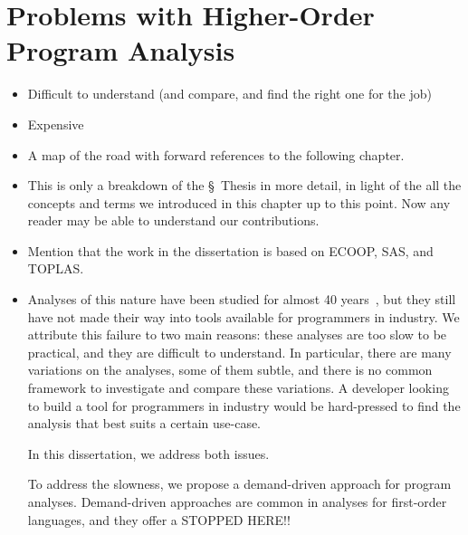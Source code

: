 \documentclass[12pt, oneside]{book}
\begin{document}
\section{Problems with Higher-Order Program Analysis}
\label{section:problems-with-higher-order-program-analysis}

\begin{itemize}
  \item Difficult to understand (and compare, and find the right one for the job)
  \item Expensive
\end{itemize}

\begin{itemize}
  \item A map of the road with forward references to the following chapter.
  \item This is only a breakdown of the §~Thesis in more detail, in light of the all the concepts and terms we introduced in this chapter up to this point. Now any reader may be able to understand our contributions.
  \item Mention that the work in the dissertation is based on ECOOP, SAS, and TOPLAS.
  \item Analyses of this nature have been studied for almost 40 years~\cite{jones-81}, but they still have not made their way into tools available for programmers in industry. We attribute this failure to two main reasons: these analyses are too slow to be practical, and they are difficult to understand. In particular, there are many variations on the analyses, some of them subtle, and there is no common framework to investigate and compare these variations. A developer looking to build a tool for programmers in industry would be hard-pressed to find the analysis that best suits a certain use-case.

  In this dissertation, we address both issues.
  
  To address the slowness, we propose a demand-driven approach for program analyses. Demand-driven approaches are common in analyses for first-order languages, and they offer a STOPPED HERE!!
  

\end{itemize}
\end{document}

